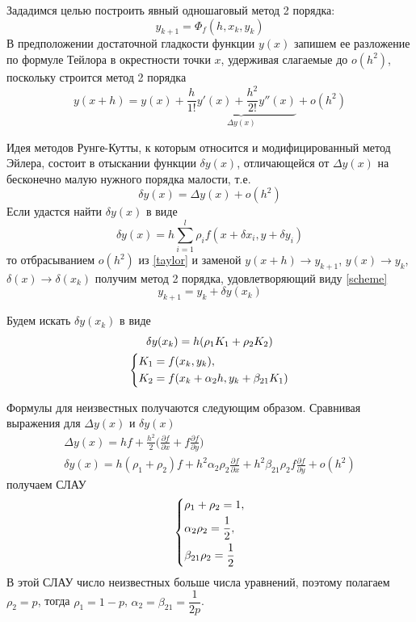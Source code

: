 \documentclass[a4paper, 12pt]{article}
\theoremstyle{mythm}
\begin{document}
	Зададимся целью построить явный одношаговый метод 2 порядка:
	\begin{equation} \label{scheme}
		y_{k+1}=\Phi_f(h,x_{k},y_{k})
	\end{equation}
	В предположении достаточной гладкости функции $y(x)$ запишем ее разложение по формуле Тейлора в окрестности точки $x$, удерживая слагаемые до $o(h^2)$, поскольку строится метод 2 порядка
	\begin{equation} \label{taylor}
		y(x+h)=y(x)+\underbrace{\dfrac{h}{1!}y'(x)+\dfrac{h^2}{2!}y''(x)}_{\Delta y(x)}+o(h^2)
	\end{equation} 

	Идея методов Рунге-Кутты, к которым относится и модифицированный метод Эйлера, состоит в отыскании функции $\delta y(x)$, отличающейся от $\Delta y(x)$ на бесконечно малую нужного порядка малости, т.е.
	\begin{equation}
		\delta y(x) = \Delta y(x) + o(h^2)
	\end{equation}
	Если удастся найти $\delta y(x)$ в виде
	\begin{equation}
		\delta y(x) = h\sum\limits_{i=1}^l \rho_if(x+\delta x_i, y + \delta y_i)
	\end{equation}
	то отбрасыванием $o(h^2)$ из \eqref{taylor} и заменой $y(x+h) \rightarrow y_{k+1}$, $y(x)\rightarrow y_k$, $\delta(x)\rightarrow \delta(x_k)$ получим метод 2 порядка, удовлетворяющий виду \eqref{scheme}
	\begin{equation}
		y_{k+1} = y_{k} + \delta y(x_{k})
	\end{equation}
	
	Будем искать $\delta y(x_k)$ в виде
	\begin{equation}
		\begin{gathered}
			\delta y(x_k) = h(\rho_1K_1 + \rho_2K_2)\\
			\begin{dcases}
				K_1 = f(x_k,y_k),\\
				K_2 = f(x_k + \alpha_2h, y_k + \beta_{21}K_1)
			\end{dcases}
		\end{gathered}		
	\end{equation}

	Формулы для неизвестных получаются следующим образом. Сравнивая выражения для $\Delta y(x)$ и $\delta y(x)$
	\begin{gather}
		\Delta y(x) = hf + \frac{h^2}{2}\bigg(\frac{\partial f}{\partial x} + f\frac{\partial f}{\partial y}\bigg)\\
		\delta y(x) = h(\rho_1 + \rho_2)f + h^2\alpha_2\rho_2\frac{\partial f}{\partial x}+h^2\beta_{21}\rho_2f\frac{\partial f}{\partial y}+o(h^2)
	\end{gather} 
	получаем СЛАУ
	\begin{equation}
		\begin{dcases}
			\rho_1 + \rho_2 = 1,\\
			\alpha_2\rho_2 = \frac{1}{2},\\
			\beta_{21}\rho_2 = \frac{1}{2}
		\end{dcases}
	\end{equation}
	В этой СЛАУ число неизвестных больше числа уравнений, поэтому полагаем $\rho_2=p$, тогда $\rho_1=1-p$, $\alpha_2=\beta_{21}=\dfrac{1}{2p}$.
\end{document}
